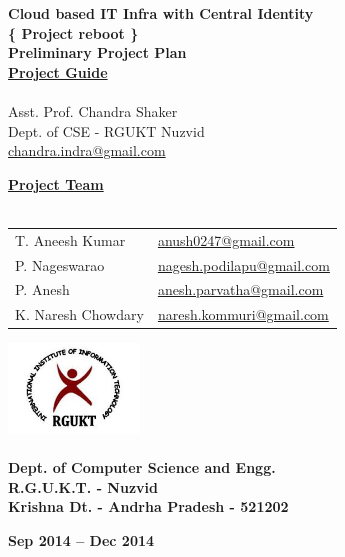\documentclass[12pt]{report}
\begin{document}
\begin{titlepage}
 \begin{center}
\LARGE
\textbf{Cloud based IT Infra with Central Identity} \\
\vfill
\large
\textbf{\{ Project reboot \}}\\
\vfill
\textbf{Preliminary Project Plan }\\
\vfill
\Large
\underline{\textbf{Project Guide }} \\ 
\large
\underline{} \\
Asst. Prof. Chandra Shaker \\
\normalsize
Dept. of CSE - RGUKT Nuzvid \\
\url{chandra.indra@gmail.com}
\vfill

\Large
\textbf{\underline{ Project Team } } \\
\underline{} \\
\large
\begin{tabular}{l  l}
T. Aneesh Kumar & \normalsize \url{anush0247@gmail.com} \\
P. Nageswarao  & \normalsize \url{nagesh.podilapu@gmail.com} \\
P. Anesh  & \normalsize \url{anesh.parvatha@gmail.com} \\
K. Naresh Chowdary  & \normalsize \url{naresh.kommuri@gmail.com} \\
\end{tabular}

\vfill


\includegraphics[width=3.5cm]{rgukt_logo.jpg} 
\Large
\underline{} \\
\underline{} \\
\normalsize
\textbf{Dept. of Computer Science and Engg. } \\
\textbf{R.G.U.K.T. - Nuzvid } \\
\textbf{Krishna Dt. - Andrha Pradesh - 521202}


\normalsize
\vfill
%
%

\textbf{Sep 2014 -- Dec 2014 }

\end{center}
\end{titlepage}
\end{document}

